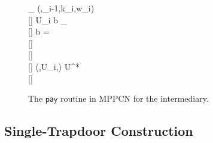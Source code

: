 \begin{figure*}[tb]
{{	\< \pcind {} \FF_{}  (,\lid_{i-1},k_i,w_i) \< \\ [-0.15\baselineskip][]
	\< \pcind U_i  b  \FF_{} \< \\ [-0.15\baselineskip][]
	\< \pcind \pcif b = \bot \pcthen \< \\ [-0.15\baselineskip][]
	\< \pcind \pcind \pcabort \< \\ [-0.15\baselineskip][]
	\< \pcelse \< \\ [-0.15\baselineskip][]
	\< \pcind {} (,U_i,\bot)  U^* \< \\ [-0.15\baselineskip][]
	\< \pcind \pcabort
}}

\caption{The $\mathsf{pay}$ routine in MPPCN for the intermediary.}
\label{fig:mppcn-intermediary}
\end{figure*}

\subsection{Single-Trapdoor Construction}

